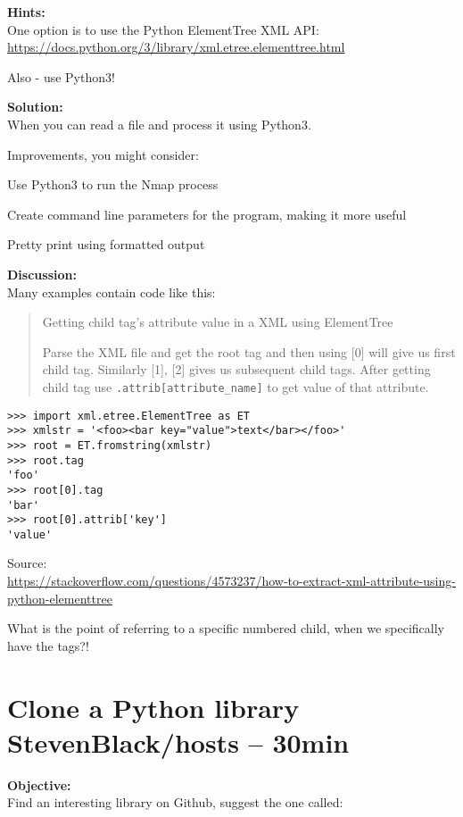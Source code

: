 \documentclass[a4paper,11pt,notitlepage]{report}
\begin{document}
{\bf Hints:}\\
One option is to use the Python ElementTree XML API:\\
\url{https://docs.python.org/3/library/xml.etree.elementtree.html}

Also - use Python3!

{\bf Solution:}\\
When you can read a file and process it using Python3.

Improvements, you might consider:
\begin{list2}
\item Use Python3 to run the Nmap process
\item Create command line parameters for the program, making it more useful
\item Pretty print using formatted output
\end{list2}
{\bf Discussion:}\\
Many examples contain code like this:

\begin{quote}
Getting child tag's attribute value in a XML using ElementTree

Parse the XML file and get the root tag and then using [0] will give us first child tag. Similarly [1], [2] gives us subsequent child tags. After getting child tag use \verb+.attrib[attribute_name]+ to get value of that attribute.
\end{quote}
\begin{verbatim}
>>> import xml.etree.ElementTree as ET
>>> xmlstr = '<foo><bar key="value">text</bar></foo>'
>>> root = ET.fromstring(xmlstr)
>>> root.tag
'foo'
>>> root[0].tag
'bar'
>>> root[0].attrib['key']
'value'
\end{verbatim}
Source:\\{\footnotesize \url{https://stackoverflow.com/questions/4573237/how-to-extract-xml-attribute-using-python-elementtree}}

What is the point of referring to a specific numbered child, when we specifically have the tags?!

\chapter{Clone a Python library StevenBlack/hosts -- 30min}
\label{ex:git-clone-XX}

{\bf Objective:}\\
Find an interesting library on Github, suggest the one called:
\end{document}
